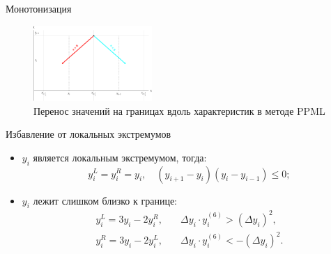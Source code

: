 \documentclass[unicode, 8pt]{beamer}
\begin{document}
    \begin{frame}{Монотонизация}
        \begin{figure}[h]
            \centering
            \includegraphics[width=0.4\textwidth]{ppml_visual.pdf}
            \caption{Перенос значений на границах вдоль характеристик в методе PPML}
            \label{fig:ppml_visual}
        \end{figure}
        \begin{block}{Избавление от локальных экстремумов}
            \begin{itemize}
                \item $ y_i $ является локальным экстремумом, тогда:
                \[
                    y_i^L = y_i^R = y_i, \quad (y_{i+1} - y_i)(y_i - y_{i-1}) \leq 0;
                \]       
                \item $ y_i $ лежит слишком близко к границе:
                \[
                    \begin{split}
                        y_i^L = 3y_i -2y_i^R, &\quad \Delta y_i \cdot y_i^{(6)} > (\Delta y_i)^2, \\
                        y_i^R = 3y_i -2y_i^L, &\quad \Delta y_i \cdot y_i^{(6)} < -(\Delta y_i)^2.
                    \end{split}  
                \]
            \end{itemize}
        \end{block}
    \end{frame}
\end{document}
